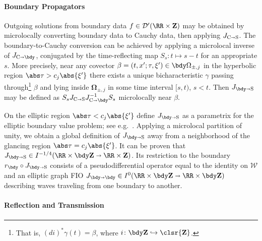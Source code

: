 \documentclass[10pt]{article}
\theoremstyle{plain}
\theoremstyle{definition}
\theoremstyle{remark}
\numberwithin{theorem}{section}
\numberwithin{example}{section}
\numberwithin{equation}{section}
\numberwithin{figure}{section}
\newcommand\bOmega{\boldsymbol\Omega}
\newcommand\JCS{J_{\text C\shortrightarrow \text S}}		%
\newcommand\JCB{J_{\text C\shortrightarrow \bdy}}		%
\newcommand\JBS{J_{\bdy\shortrightarrow \text S}}		%
\newcommand\JBB{J_{\bdy\shortrightarrow \bdy}}			%
\begin{document}
\paragraph{Boundary Propagators}

Outgoing solutions from boundary data $f\in\mathcal D'(\RR\times\mathbf Z)$ may be obtained by microlocally converting boundary data to Cauchy data, then applying $\JCS$. The boundary-to-Cauchy conversion can be achieved by applying a microlocal inverse of $\JCB$, conjugated by the time-reflecting map $S_s\colon t\mapsto s-t$ for an appropriate $s$. More precisely, near any covector $\beta=(t,x';\tau,\xi')\in\bdy\Omega_{\pm,j}$ in the hyperbolic region $\abs\tau>c_j\abs{\xi'}$ there exists a unique bicharacteristic $\gamma$ passing through\footnote{That is, $(di)^*\gamma(t)=\beta$, where $i\colon \bdy \mathbf Z\hookrightarrow \clsr {\mathbf Z}$.} $\beta$ and lying inside $\bOmega_{\pm,j}$ in some time interval $[s,t)$, $s<t$. Then $\JBS$ may be defined as $S_s\JCS \JCB^{-1}S_s$ microlocally near $\beta$.

On the elliptic region $\abs\tau<c_j\abs{\xi'}$ define $\JBS$ as a parametrix for the elliptic boundary value problem; see e.g.~\cite[]{SU-TATBrain}.
Applying a microlocal partition of unity, we obtain a global definition of $\JBS$ away from a neighborhood of the glancing region $\abs\tau=c_j\abs{\xi'}$. It can be proven that $\JBS\in I^{-1/4}(\RR\times\bdy\mathbf Z\shortrightarrow \RR\times \mathbf Z)$. Its restriction to the boundary $r_\bdy\circ\JBS$ consists of a pseudodifferential operator equal to the identity on $\mathcal W$ and an elliptic graph FIO $\JBB\in I^0(\RR\times\bdy\mathbf Z\shortrightarrow\RR\times\bdy\mathbf Z)$ describing waves traveling from one boundary to another.


\paragraph{Reflection and Transmission}
\end{document}

